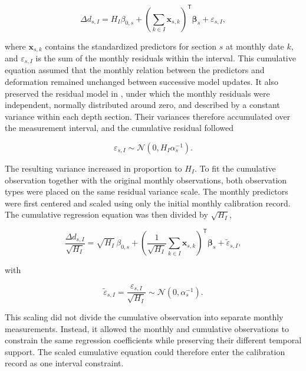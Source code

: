 \begin{equation}
\Delta d_{s,I}
=
H_I\beta_{0,s}
+
\left(
\sum_{k\in I}\boldsymbol{x}_{s,k}
\right)^{\mathsf{T}}
\boldsymbol{\beta}_{s}
+
\varepsilon_{s,I},
\label{eq:cumulative_deformation_model}
\end{equation}

\noindent where $\boldsymbol{x}_{s,k}$ contains the standardized predictors for section $s$ at monthly date $k$, and $\varepsilon_{s,I}$ is the sum of the monthly residuals within the interval. This cumulative equation assumed that the monthly relation between the predictors and deformation remained unchanged between successive model updates. It also preserved the residual model in , under which the monthly residuals were independent, normally distributed around zero, and described by a constant variance within each depth section. Their variances therefore accumulated over the measurement interval, and the cumulative residual followed

\begin{equation}
\varepsilon_{s,I}
\sim
\mathcal{N}
\left(
0,
H_I\alpha_s^{-1}
\right).
\label{eq:cumulative_residual_distribution}
\end{equation}

The resulting variance increased in proportion to $H_I$. To fit the cumulative observation together with the original monthly observations, both observation types were placed on the same residual variance scale. The monthly predictors were first centered and scaled using only the initial monthly calibration record. The cumulative regression equation was then divided by $\sqrt{H_I}$,

\begin{equation}
\frac{\Delta d_{s,I}}{\sqrt{H_I}}
=
\sqrt{H_I}\,\beta_{0,s}
+
\left(
\frac{1}{\sqrt{H_I}}
\sum_{k\in I}\boldsymbol{x}_{s,k}
\right)^{\mathsf{T}}
\boldsymbol{\beta}_{s}
+
\widetilde{\varepsilon}_{s,I},
\label{eq:scaled_cumulative_deformation_model}
\end{equation}

\noindent with

\begin{equation}
\widetilde{\varepsilon}_{s,I}
=
\frac{\varepsilon_{s,I}}{\sqrt{H_I}}
\sim
\mathcal{N}
\left(
0,
\alpha_s^{-1}
\right).
\label{eq:scaled_cumulative_residual}
\end{equation}

This scaling did not divide the cumulative observation into separate monthly measurements. Instead, it allowed the monthly and cumulative observations to constrain the same regression coefficients while preserving their different temporal support. The scaled cumulative equation could therefore enter the calibration record as one interval constraint.

